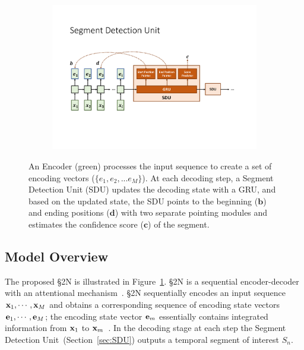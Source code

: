 \documentclass[10pt,journal,compsoc]{IEEEtran}
\begin{document}
\begin{figure}[t]
\centering
    
    \begin{subfigure}[b]{1.0\textwidth}
   	\includegraphics[width=\textwidth]{figures/figures/Figures2.pdf}
   \end{subfigure}
   \caption{An Encoder (green) processes the input sequence to create a set of encoding vectors ($\{e_1, e_2,... e_M\}$). At each decoding step, a Segment Detection Unit (SDU) updates the decoding state with a GRU, and based on the updated state, the SDU points to the beginning ($\mathbf{b}$) and ending positions ($\mathbf{d}$) with two separate pointing modules and estimates the confidence score ($\mathbf{c}$) of the segment. \label{fig:model}}   
\vspace{-.05in}
\end{figure}

\subsection{Model Overview}
The proposed \S2N is illustrated in Figure~\ref{fig:model}.  \S2N is a sequential encoder-decoder with an attentional mechanism~\cite{bahdanau2014neural}. \S2N sequentially encodes an input sequence ${\bf x}_1,\cdots,{\bf x}_M$ and obtains a corresponding sequence of encoding state vectors ${\bf e}_1,\cdots, {\bf e}_M$; the encoding state vector ${\bf e}_m$ essentially contains integrated information from ${\bf x}_1$ to ${\bf x}_m$~\cite{sutskever2014sequence,karpathy2015visualizing}. In the decoding stage at each step the Segment Detection Unit~(Section~\ref{sec:SDU}) outputs a temporal segment of interest $S_n$.
\end{document}
